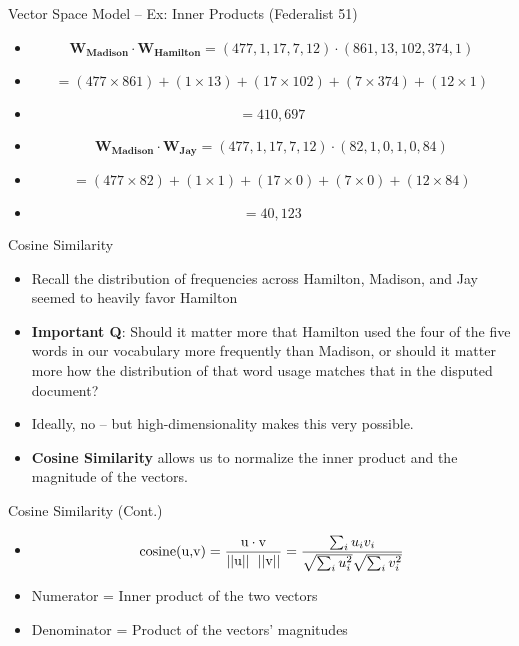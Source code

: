 \documentclass[
  ignorenonframetext,
  aspectratio=169]{beamer}
\begin{document}
\begin{frame}{Vector Space Model -- Ex: Inner Products (Federalist 51)}
\label{vector-space-model-ex-inner-products-federalist-51}
\footnotesize
\begin{itemize}
\item[] $$\mathbf{W_{Madison}} \cdot \mathbf{W_{Hamilton}} = (477, 1, 17, 7, 12) \cdot (861, 13, 102, 374, 1) $$
\item[] $$= (477 \times 861) + (1 \times 13) + (17 \times 102) + (7 \times 374) + (12 \times 1) $$
\item[] $$= 410,697$$
\item[] $$\mathbf{W_{Madison}} \cdot \mathbf{W_{Jay}} = (477, 1, 17, 7, 12) \cdot (82, 1, 0, 1, 0, 84) $$
\item[] $$= (477 \times 82) + (1 \times 1) + (17 \times 0) + (7 \times 0) + (12 \times 84)$$
\item[] $$= 40,123$$
\end{itemize}
\end{frame}

\begin{frame}{Cosine Similarity}
\label{cosine-similarity}
\begin{itemize}
\item Recall the distribution of frequencies across Hamilton, Madison, and Jay seemed to heavily favor Hamilton \par \vspace{2.5mm}
\item \textbf{Important Q}: Should it matter more that Hamilton used the four of the five words in our vocabulary more frequently than Madison, or should it matter more how the distribution of that word usage matches that in the disputed document? \par \vspace{2.5mm}
\item Ideally, no -- but high-dimensionality makes this very possible. \par \vspace{2.5mm}
\item \textbf{Cosine Similarity} allows us to normalize the inner product and the magnitude of the vectors. 
\end{itemize}
\end{frame}

\begin{frame}{Cosine Similarity (Cont.)}
\label{cosine-similarity-cont.}
\begin{itemize}
\item[] $$
\text{cosine(u,v)} = \frac{\text{u}\cdot \text{v}}{||\text{u}||\hspace{2mm}||\text{v}||} = \frac{\sum_iu_iv_i}{\sqrt{\sum_iu_{i}^2} \sqrt{\sum_{i}v_{i}^2}}$$
\item Numerator = Inner product of the two vectors
\item Denominator = Product of the vectors' magnitudes
\end{itemize}
\end{frame}
\end{document}
